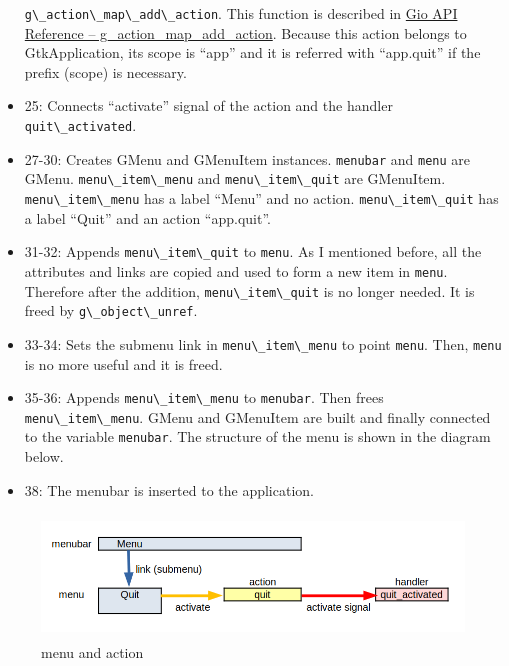 \begin{itemize}
  \passthrough{\lstinline!g\_action\_map\_add\_action!}. This function
  is described in
  \href{https://docs.gtk.org/gio/method.ActionMap.add_action.html}{Gio
  API Reference -- g\_action\_map\_add\_action}. Because this action
  belongs to GtkApplication, its scope is ``app'' and it is referred
  with ``app.quit'' if the prefix (scope) is necessary.
\item
  25: Connects ``activate'' signal of the action and the handler
  \passthrough{\lstinline!quit\_activated!}.
\item
  27-30: Creates GMenu and GMenuItem instances.
  \passthrough{\lstinline!menubar!} and \passthrough{\lstinline!menu!}
  are GMenu. \passthrough{\lstinline!menu\_item\_menu!} and
  \passthrough{\lstinline!menu\_item\_quit!} are GMenuItem.
  \passthrough{\lstinline!menu\_item\_menu!} has a label ``Menu'' and no
  action. \passthrough{\lstinline!menu\_item\_quit!} has a label
  ``Quit'' and an action ``app.quit''.
\item
  31-32: Appends \passthrough{\lstinline!menu\_item\_quit!} to
  \passthrough{\lstinline!menu!}. As I mentioned before, all the
  attributes and links are copied and used to form a new item in
  \passthrough{\lstinline!menu!}. Therefore after the addition,
  \passthrough{\lstinline!menu\_item\_quit!} is no longer needed. It is
  freed by \passthrough{\lstinline!g\_object\_unref!}.
\item
  33-34: Sets the submenu link in
  \passthrough{\lstinline!menu\_item\_menu!} to point
  \passthrough{\lstinline!menu!}. Then, \passthrough{\lstinline!menu!}
  is no more useful and it is freed.
\item
  35-36: Appends \passthrough{\lstinline!menu\_item\_menu!} to
  \passthrough{\lstinline!menubar!}. Then frees
  \passthrough{\lstinline!menu\_item\_menu!}. GMenu and GMenuItem are
  built and finally connected to the variable
  \passthrough{\lstinline!menubar!}. The structure of the menu is shown
  in the diagram below.
\item
  38: The menubar is inserted to the application.
\end{itemize}

\begin{figure}
\centering
\includegraphics[width=12.555cm,height=3.285cm]{../image/menu1.png}
\caption{menu and action}
\end{figure}

